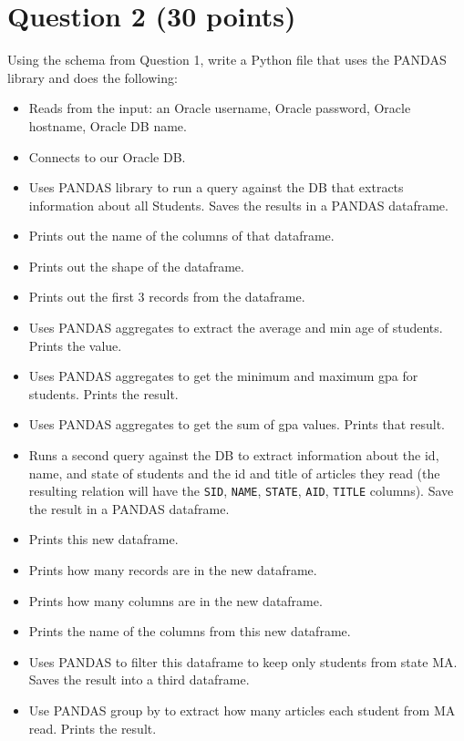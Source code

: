 \documentclass[letterpaper, 11pt]{article}
\begin{document}
\section*{Question 2 (30 points)}

Using the schema from Question 1, write a Python file that uses the PANDAS library and does the following:
\begin{itemize}[label=-]
    \item Reads from the input: an Oracle username, Oracle password, Oracle hostname, Oracle DB name.
    \item Connects to our Oracle DB.
    \item Uses PANDAS library to run a query against the DB that extracts information about all Students. Saves the results in a PANDAS dataframe.
    \item Prints out the name of the columns of that dataframe.
    \item Prints out the shape of the dataframe.
    \item Prints out the first 3 records from the dataframe.
    \item Uses PANDAS aggregates to extract the average and min age of students. Prints the value.
    \item Uses PANDAS aggregates to get the minimum and maximum gpa for students. Prints the result.
    \item Uses PANDAS aggregates to get the sum of gpa values. Prints that result.
    \item Runs a second query against the DB to extract information about the id, name, and state of students and the id and title of articles they read (the resulting relation will have the \texttt{SID}, \texttt{NAME}, \texttt{STATE}, \texttt{AID}, \texttt{TITLE} columns). Save the result in a PANDAS dataframe.
    \item Prints this new dataframe.
    \item Prints how many records are in the new dataframe.
    \item Prints how many columns are in the new dataframe.
    \item Prints the name of the columns from this new dataframe.
    \item Uses PANDAS to filter this dataframe to keep only students from state MA. Saves the result into a third dataframe.
    \item Use PANDAS group by to extract how many articles each student from MA read. Prints the result.
\end{itemize}
\end{document}
